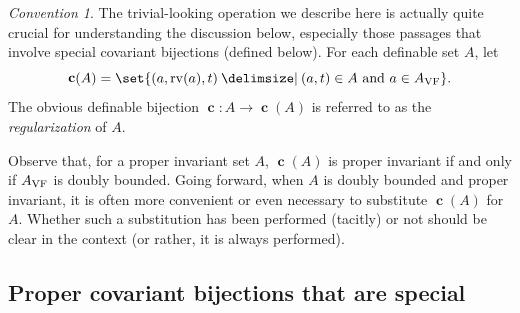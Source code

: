 \documentclass[12pt]{amsart}
\newcommand{\memph}[1]{{\color{magenta}\emph{#1}}}
\theoremstyle{plain}
\theoremstyle{definition}
\newtheorem{defn}[thm]{Definition}
\theoremstyle{remark}
\newtheorem{conv}[thm]{Convention}
\numberwithin{equation}{section}
\theoremstyle{plain}
\newcommand{\VF}{\textup{VF}}
\newcommand{\RV}{\textup{RV}}
\newcommand{\tand}{~\text{and}~}
\newcommand{\0}{\emptyset}
\newcommand{\fun}{\longrightarrow}
\newcommand{\efun}{\longmapsto}
\providecommand\given{}
\newcommand\SetSymbol[1][]{%
\nonscript \: #1 \vert
\allowbreak
\nonscript\:
\mathopen{}}
\renewcommand\given{\SetSymbol[\delimsize]}
\DeclareMathOperator{\rv}{rv}
\DeclareMathOperator{\can}{\mathbf{c}}
\begin{document}
\begin{conv}\label{conv:can}
The trivial-looking operation we describe here is actually quite crucial for understanding the discussion below, especially those passages that involve special covariant bijections (defined below). For each definable set $A$, let
\[
\can(A) = \set{(a, \rv(a), t) \given (a, t) \in A \tand a \in A_{\VF}}.
\]
The obvious definable bijection $\can : A \fun \can(A)$ is  referred to as the \memph{regularization} of $A$.

Observe that, for a proper invariant set $A$, $\can(A)$ is proper invariant if and only if $A_{\VF}$ is  doubly bounded. Going forward, when $A$ is doubly bounded and proper invariant, it is often more convenient or even necessary to substitute $\can(A)$ for $A$. Whether such a substitution has been performed (tacitly) or not should be clear in the context (or rather, it is always performed).
\end{conv}

\subsection{Proper covariant bijections that are special}
\end{document}
